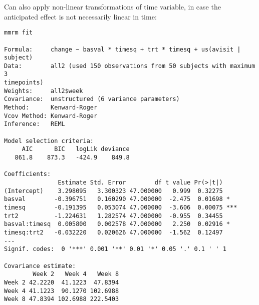 \documentclass[
  letterpaper,
  DIV=11,
  numbers=noendperiod]{scrreprt}
\newenvironment{Shaded}{\begin{snugshade}}{\end{snugshade}}
\newcommand{\AttributeTok}[1]{\textcolor[rgb]{0.40,0.45,0.13}{#1}}
\newcommand{\DecValTok}[1]{\textcolor[rgb]{0.68,0.00,0.00}{#1}}
\newcommand{\FunctionTok}[1]{\textcolor[rgb]{0.28,0.35,0.67}{#1}}
\newcommand{\NormalTok}[1]{\textcolor[rgb]{0.00,0.23,0.31}{#1}}
\newcommand{\OtherTok}[1]{\textcolor[rgb]{0.00,0.23,0.31}{#1}}
\newcommand{\SpecialCharTok}[1]{\textcolor[rgb]{0.37,0.37,0.37}{#1}}
\newcommand{\StringTok}[1]{\textcolor[rgb]{0.13,0.47,0.30}{#1}}
\begin{document}
Can also apply non-linear transformations of time variable, in case the
anticipated effect is not necessarily linear in time:

\begin{Shaded}
\end{Shaded}

\begin{verbatim}
mmrm fit

Formula:     change ~ basval * timesq + trt * timesq + us(avisit | subject)
Data:        all2 (used 150 observations from 50 subjects with maximum 3 
timepoints)
Weights:     all2$week
Covariance:  unstructured (6 variance parameters)
Method:      Kenward-Roger
Vcov Method: Kenward-Roger
Inference:   REML

Model selection criteria:
     AIC      BIC   logLik deviance 
   861.8    873.3   -424.9    849.8 

Coefficients: 
               Estimate Std. Error        df t value Pr(>|t|)    
(Intercept)    3.298095   3.300323 47.000000   0.999  0.32275    
basval        -0.396751   0.160290 47.000000  -2.475  0.01698 *  
timesq        -0.191395   0.053074 47.000000  -3.606  0.00075 ***
trt2          -1.224631   1.282574 47.000000  -0.955  0.34455    
basval:timesq  0.005800   0.002578 47.000000   2.250  0.02916 *  
timesq:trt2   -0.032220   0.020626 47.000000  -1.562  0.12497    
---
Signif. codes:  0 '***' 0.001 '**' 0.01 '*' 0.05 '.' 0.1 ' ' 1

Covariance estimate:
        Week 2   Week 4   Week 8
Week 2 42.2220  41.1223  47.8394
Week 4 41.1223  90.1270 102.6988
Week 8 47.8394 102.6988 222.5403
\end{verbatim}
\end{document}
